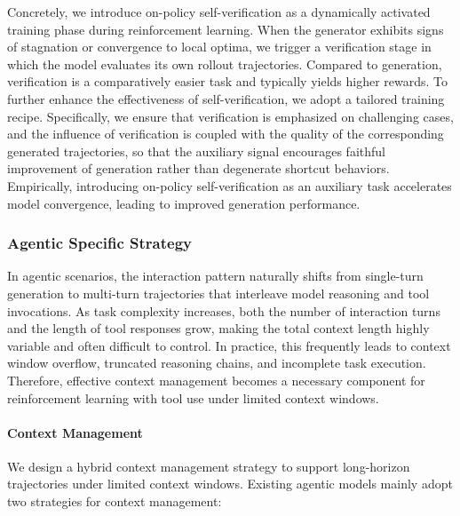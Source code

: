 \documentclass{article}
\begin{document}
Concretely, we introduce on-policy self-verification as a dynamically activated training phase during reinforcement learning.
When the generator exhibits signs of stagnation or convergence to local optima, we trigger a verification stage in which the model evaluates its own rollout trajectories.
Compared to generation, verification is a comparatively easier task and typically yields higher rewards.
To further enhance the effectiveness of self-verification, we adopt a tailored training recipe.
Specifically, we ensure that verification is emphasized on challenging cases, and the influence of verification is coupled with the quality of the corresponding generated trajectories, so that the auxiliary signal encourages faithful improvement of generation rather than degenerate shortcut behaviors.
Empirically, introducing on-policy self-verification as an auxiliary task accelerates model convergence, leading to improved generation performance.

\subsubsection{Agentic Specific Strategy}
In agentic scenarios, the interaction pattern naturally shifts from single-turn generation to multi-turn trajectories that interleave model reasoning and tool invocations.
As task complexity increases, both the number of interaction turns and the length of tool responses grow, making the total context length highly variable and often difficult to control.
In practice, this frequently leads to context window overflow, truncated reasoning chains, and incomplete task execution.
Therefore, effective context management becomes a necessary component for reinforcement learning with tool use under limited context windows.

\paragraph{Context Management}
We design a hybrid context management strategy to support long-horizon trajectories under limited context windows.
Existing agentic models mainly adopt two strategies for context management:
\end{document}
